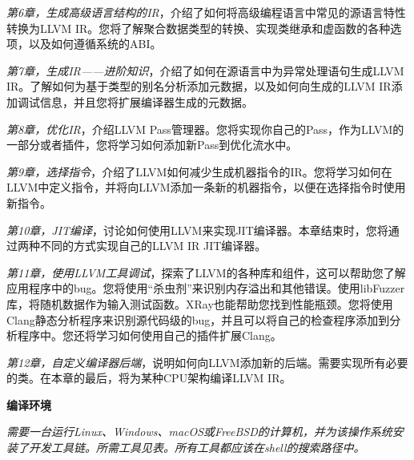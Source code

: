 \textit{第6章，生成高级语言结构的IR}，介绍了如何将高级编程语言中常见的源语言特性转换为LLVM IR。您将了解聚合数据类型的转换、实现类继承和虚函数的各种选项，以及如何遵循系统的ABI。\par

\textit{第7章，生成IR——进阶知识}，介绍了如何在源语言中为异常处理语句生成LLVM IR。了解如何为基于类型的别名分析添加元数据，以及如何向生成的LLVM IR添加调试信息，并且您将扩展编译器生成的元数据。\par

\textit{第8章，优化IR}，介绍LLVM Pass管理器。您将实现你自己的Pass，作为LLVM的一部分或者插件，您将学习如何添加新Pass到优化流水中。\par

\textit{第9章，选择指令}，介绍了LLVM如何减少生成机器指令的IR。您将学习如何在LLVM中定义指令，并将向LLVM添加一条新的机器指令，以便在选择指令时使用新指令。\par

\textit{第10章，JIT编译}，讨论如何使用LLVM来实现JIT编译器。本章结束时，您将通过两种不同的方式实现自己的LLVM IR JIT编译器。\par

\textit{第11章，使用LLVM工具调试}，探索了LLVM的各种库和组件，这可以帮助您了解应用程序中的bug。您将使用“杀虫剂”来识别内存溢出和其他错误。使用libFuzzer库，将随机数据作为输入测试函数。XRay也能帮助您找到性能瓶颈。您将使用Clang静态分析程序来识别源代码级的bug，并且可以将自己的检查程序添加到分析程序中。您还将学习如何使用自己的插件扩展Clang。\par

\textit{第12章，自定义编译器后端}，说明如何向LLVM添加新的后端。需要实现所有必要的类。在本章的最后，将为某种CPU架构编译LLVM IR。\par

\hspace*{\fill} \par %
\textbf{编译环境}

\textit{需要一台运行Linux、Windows、macOS或FreeBSD的计算机，并为该操作系统安装了开发工具链。所需工具见表。所有工具都应该在shell的搜索路径中。}\par

